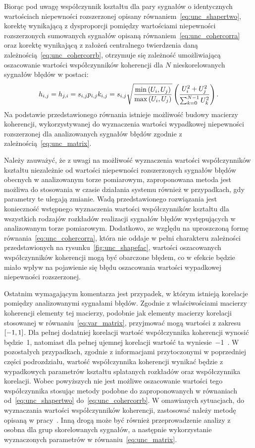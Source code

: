 Biorąc pod uwagę współczynnik kształtu dla pary sygnałów o identycznych wartościach niepewności rozszerzonej opisany równaniem~\eqref{eq:unc_shapertwo}, korektę wynikającą z dysproporcji pomiędzy wartościami niepewności rozszerzonych sumowanych sygnałów opisaną równaniem~\eqref{eq:unc_cohercorra} oraz korektę wynikającą z założeń centralnego twierdzenia daną zależnością~\eqref{eq:unc_cohercorrb}, otrzymuje się zależność umożliwiającą oszacowanie wartości współczynników koherencji dla $N$ nieskorelowanych sygnałów błędów w postaci:
\begin{equation}
h_{i,j} = h_{j,i} = s_{i,j} p_{i,j} k_{i,j} = s_{i,j} \sqrt{\frac{\min \left(U_{i}, U_{j}\right)}{\max \left(U_{i}, U_{j}\right)}} \left( \frac{U_{i}^{2} + U_{j}^{2}}{\sum _{k = 0} ^{N-1} U_{k}^{2}} \right) \label{eq:unc_coher}.
\end{equation}
Na podstawie przedstawionego równania istnieje możliwość budowy macierzy koherencji, wykorzystywanej do wyznaczenia wartości wypadkowej niepewności rozszerzonej dla analizowanych sygnałów błędów zgodnie z zależnością~\eqref{eq:unc_matrix}.

Należy zauważyć, że z uwagi na możliwość wyznaczenia wartości współczynników kształtu niezależnie od wartości niepewności rozszerzonych sygnałów błędów obecnych w analizowanym torze pomiarowym, zaproponowana metoda jest możliwa do stosowania w czasie działania systemu również w przypadkach, gdy parametry te ulegają zmianie. Wadą przedstawionego rozwiązania jest konieczność wstępnego wyznaczenia wartości współczynników kształtu dla wszystkich rodzajów rozkładów realizacji sygnałów błędów występujących w analizowanym torze pomiarowym. Dodatkowo, ze względu na uproszczoną formę równania~\eqref{eq:unc_cohercorra}, która nie oddaje w pełni charakteru zależności przedstawionych na rysunku~\ref{fig:unc_shapefac}, wartości oszacowanych współczynników koherencji mogą być obarczone błędem, co w efekcie będzie miało wpływ na pojawienie się błędu oszacowania wartości wypadkowej niepewności rozszerzonej.

Ostatnim wymagającym komentarza jest przypadek, w którym istnieją korelacje pomiędzy analizowanymi sygnałami błędów. Zgodnie z właściwościami macierzy koherencji elementy tej macierzy, podobnie jak elementy macierzy korelacji stosowanej w równaniu~\eqref{eq:var_matrix}, przyjmować mogą wartości z zakresu $\interval{-1}{1}$. Dla pełnej dodatniej korelacji wartość współczynnika koherencji wynosić będzie~\num{1}, natomiast dla pełnej ujemnej korelacji wartość ta wyniesie~\num{-1}~\cite{jakubiec_redmono}. W pozostałych przypadkach, zgodnie z informacjami przytoczonymi w poprzedniej części podrozdziału, wartość współczynnika koherencji wynikać będzie z wypadkowych parametrów kształtu splatanych rozkładów oraz współczynnika korelacji. Wobec powyższych nie jest możliwe oszacowanie wartości tego współczynnika stosując metody podobne do zaproponowanych w równaniach od~\eqref{eq:unc_shapertwo} do~\eqref{eq:unc_cohercorrb}. W omawianych sytuacjach, do wyznaczania wartości współczynników koherencji, zastosować należy metodę opisaną w pracy~\cite{jakubiec_reductive}. Inną drogą może być również przeprowadzenie analizy z osobna dla grup skorelowanych sygnałów, a następnie wykorzystanie wyznaczonych parametrów w równaniu~\eqref{eq:unc_matrix}.

